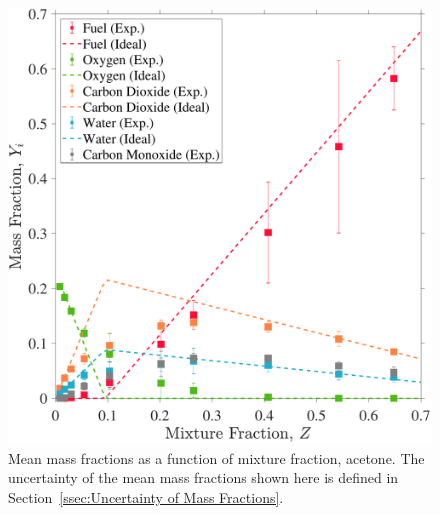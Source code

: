 \documentclass[12pt]{article}
\begin{document}
\begin{figure}[!]
	\centering
\includegraphics[width=\textwidth,keepaspectratio]{Adjusted_FuelAcetone_Mixture_Fraction_Intermediate_Plot.pdf}
	\caption[Mean mass fractions as a function of mixture fraction, acetone]{Mean mass fractions as a function of mixture fraction, acetone. The uncertainty of the mean mass fractions shown here is defined in Section~\ref{ssec:Uncertainty of Mass Fractions}.}
	\label{fig:Acetone_Mix_Frac}
\end{figure}
\end{document}

